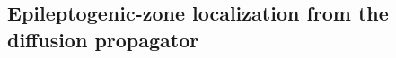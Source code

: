 %

\subsection{Epileptogenic-zone localization from the diffusion propagator}
\label{ssec:methods_epi}

